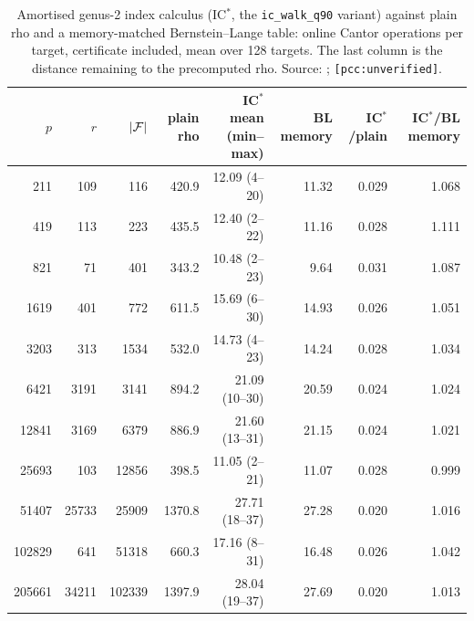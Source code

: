 \begin{table}[t]
\centering\footnotesize
\begin{tabular}{@{}rrrrrrrr@{}}
\toprule
$p$ & $r$ & $\lvert \mathcal{F} \rvert$ & plain rho & IC$^*$ mean (min--max) & BL memory & IC$^*$/plain & IC$^*$/BL memory \\
\midrule
211 & 109 & 116 & 420.9 & 12.09 (4--20) & 11.32 & 0.029 & 1.068 \\
419 & 113 & 223 & 435.5 & 12.40 (2--22) & 11.16 & 0.028 & 1.111 \\
821 & 71 & 401 & 343.2 & 10.48 (2--23) & 9.64 & 0.031 & 1.087 \\
1619 & 401 & 772 & 611.5 & 15.69 (6--30) & 14.93 & 0.026 & 1.051 \\
3203 & 313 & 1534 & 532.0 & 14.73 (4--23) & 14.24 & 0.028 & 1.034 \\
6421 & 3191 & 3141 & 894.2 & 21.09 (10--30) & 20.59 & 0.024 & 1.024 \\
12841 & 3169 & 6379 & 886.9 & 21.60 (13--31) & 21.15 & 0.024 & 1.021 \\
25693 & 103 & 12856 & 398.5 & 11.05 (2--21) & 11.07 & 0.028 & 0.999 \\
51407 & 25733 & 25909 & 1370.8 & 27.71 (18--37) & 27.28 & 0.020 & 1.016 \\
102829 & 641 & 51318 & 660.3 & 17.16 (8--31) & 16.48 & 0.026 & 1.042 \\
205661 & 34211 & 102339 & 1397.9 & 28.04 (19--37) & 27.69 & 0.020 & 1.013 \\
\bottomrule
\end{tabular}
\caption[]{Amortised genus-2 index calculus (IC$^*$, the
\texttt{ic\_walk\_q90} variant) against plain rho and a memory-matched
Bernstein--Lange table: online Cantor operations per target, certificate
included, mean over 128 targets. The last column is the distance remaining
to the precomputed rho. Source:
;
\texttt{[pcc:unverified]}.}
\label{tab:jac-chain-amort}
\end{table}

